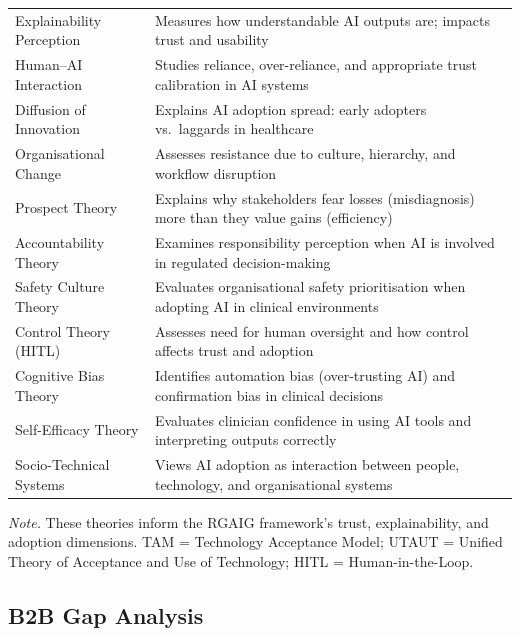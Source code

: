 {\begin{xltabular}{\textwidth}{@{} >{\raggedright\arraybackslash}p{3.2cm} L @{}}
\addlinespace
Explainability Perception & Measures how understandable AI outputs are; impacts trust and usability \\
\addlinespace
Human--AI Interaction & Studies reliance, over-reliance, and appropriate trust calibration in AI systems \\
\addlinespace
Diffusion of Innovation & Explains AI adoption spread: early adopters vs.\ laggards in healthcare \\
\addlinespace
Organisational Change & Assesses resistance due to culture, hierarchy, and workflow disruption \\
\addlinespace
Prospect Theory & Explains why stakeholders fear losses (misdiagnosis) more than they value gains (efficiency) \\
\addlinespace
Accountability Theory & Examines responsibility perception when AI is involved in regulated decision-making \\
\addlinespace
Safety Culture Theory & Evaluates organisational safety prioritisation when adopting AI in clinical environments \\
\addlinespace
Control Theory (HITL) & Assesses need for human oversight and how control affects trust and adoption \\
\addlinespace
Cognitive Bias Theory & Identifies automation bias (over-trusting AI) and confirmation bias in clinical decisions \\
\addlinespace
Self-Efficacy Theory & Evaluates clinician confidence in using AI tools and interpreting outputs correctly \\
\addlinespace
Socio-Technical Systems & Views AI adoption as interaction between people, technology, and organisational systems \\
\end{xltabular}}
\vspace{0.5em}
\noindent\textit{Note.} These theories inform the RGAIG framework's trust, explainability, and adoption dimensions. TAM = Technology Acceptance Model; UTAUT = Unified Theory of Acceptance and Use of Technology; HITL = Human-in-the-Loop.
\fi %

\label{sec:b2b_psychological}
\label{tab:b2b_psychological}


\iffalse
\subsection{B2B Gap Analysis}
\label{sec:b2b_gap}

